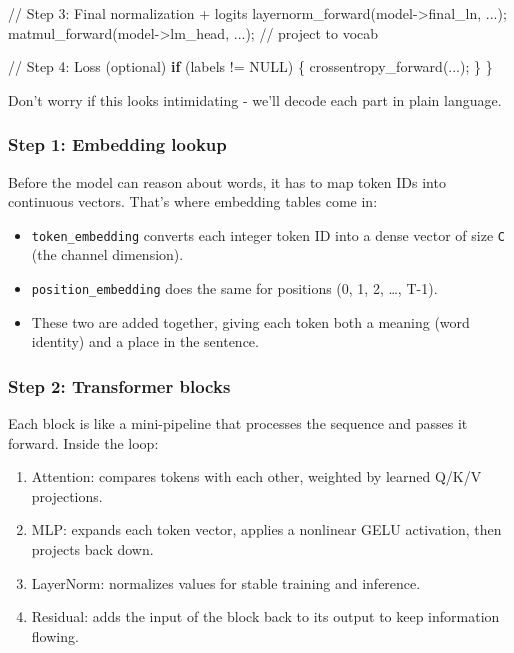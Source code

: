 \documentclass[
  letterpaper,
  DIV=11,
  numbers=noendperiod]{scrreprt}
\newenvironment{Shaded}{\begin{snugshade}}{\end{snugshade}}
\newcommand{\CommentTok}[1]{\textcolor[rgb]{0.37,0.37,0.37}{#1}}
\newcommand{\ControlFlowTok}[1]{\textcolor[rgb]{0.00,0.23,0.31}{\textbf{#1}}}
\newcommand{\NormalTok}[1]{\textcolor[rgb]{0.00,0.23,0.31}{#1}}
\newcommand{\OperatorTok}[1]{\textcolor[rgb]{0.37,0.37,0.37}{#1}}
\providecommand{\tightlist}{%
  \setlength{\itemsep}{0pt}\setlength{\parskip}{0pt}}
\begin{document}
\begin{Shaded}
\begin{Highlighting}[]
    \CommentTok{// Step 3: Final normalization + logits}
\NormalTok{    layernorm\_forward}\OperatorTok{(}\NormalTok{model}\OperatorTok{{-}\textgreater{}}\NormalTok{final\_ln}\OperatorTok{,} \OperatorTok{...);}
\NormalTok{    matmul\_forward}\OperatorTok{(}\NormalTok{model}\OperatorTok{{-}\textgreater{}}\NormalTok{lm\_head}\OperatorTok{,} \OperatorTok{...);} \CommentTok{// project to vocab}

    \CommentTok{// Step 4: Loss (optional)}
    \ControlFlowTok{if} \OperatorTok{(}\NormalTok{labels }\OperatorTok{!=}\NormalTok{ NULL}\OperatorTok{)} \OperatorTok{\{}
\NormalTok{        crossentropy\_forward}\OperatorTok{(...);}
    \OperatorTok{\}}
\OperatorTok{\}}
\end{Highlighting}
\end{Shaded}

Don't worry if this looks intimidating - we'll decode each part in plain
language.

\subsubsection{Step 1: Embedding lookup}\label{step-1-embedding-lookup}

Before the model can reason about words, it has to map token IDs into
continuous vectors. That's where embedding tables come in:

\begin{itemize}
\tightlist
\item
  \texttt{token\_embedding} converts each integer token ID into a dense
  vector of size \texttt{C} (the channel dimension).
\item
  \texttt{position\_embedding} does the same for positions (0, 1, 2,
  \ldots, T-1).
\item
  These two are added together, giving each token both a meaning (word
  identity) and a place in the sentence.
\end{itemize}

\subsubsection{Step 2: Transformer
blocks}\label{step-2-transformer-blocks}

Each block is like a mini-pipeline that processes the sequence and
passes it forward. Inside the loop:

\begin{enumerate}
\def\labelenumi{\arabic{enumi}.}
\tightlist
\item
  Attention: compares tokens with each other, weighted by learned Q/K/V
  projections.
\item
  MLP: expands each token vector, applies a nonlinear GELU activation,
  then projects back down.
\item
  LayerNorm: normalizes values for stable training and inference.
\item
  Residual: adds the input of the block back to its output to keep
  information flowing.
\end{enumerate}
\end{document}
